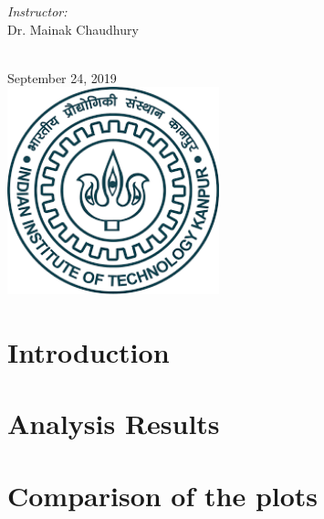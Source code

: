 \documentclass[12pt]{article}
\begin{document}
\begin{titlepage}
\begin{minipage}{0.4\textwidth}
\end{minipage}
\begin{minipage}{0.4\textwidth}
\begin{flushright} \large
\emph{Instructor:} \\
Dr. Mainak Chaudhury %
\end{flushright}
\end{minipage}\\[1cm]
{\large September 24, 2019}\\[1cm] %
\includegraphics[width=\textwidth,height=6cm,keepaspectratio]{iitk.png}%
\vfill %

\end{titlepage}
\newpage

\section{Introduction}


\section{Analysis Results}


\section{Comparison of the plots}

\end{document}
